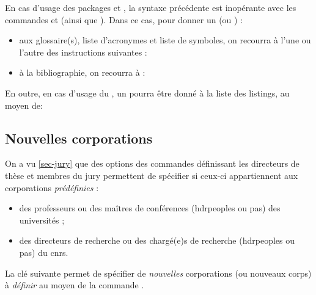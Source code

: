 En cas d'usage des packages  et , la
syntaxe précédente est inopérante avec les commandes
 et  (ainsi que
). Dans ce cas, pour donner un  (ou
)  :
\begin{itemize}
\item%
  aux glossaire(s), liste d'acronymes et liste de symboles, on recourra
  à l'une ou l'autre des instructions suivantes :
\begin{bodycode}[listing options={morekeywords={[2]title}}]
\printglossary[title="\meta{titre alternatif}"]
\printglossaries[title="\meta{titre alternatif}"]
\printacronyms[title="\meta{titre alternatif}"]
\printsymbols[title="\meta{titre alternatif}"]
\end{bodycode}
\item%
  à la bibliographie, on recourra à :
\begin{bodycode}[listing options={morekeywords={[2]title}}]
\printbibliography[title="\meta{titre alternatif}"]
\end{bodycode}
\end{itemize}

En outre, en cas d'usage du , un 
pourra être donné à la liste des listings, au moyen de:
\begin{preamblecode}[title=Par exemple dans le \File{\configurationfile}]
\renewcommand\lstlistingname{"\meta{titre alternatif}"}
\end{preamblecode}

\subsection{Nouvelles corporations}\label{sec-nouveaux-corps}
%
%

On a vu \vref{sec-jury} que des options des commandes définissant les
directeurs de thèse et membres du jury permettent de spécifier si ceux-ci
appartiennent aux corporations \emph{prédéfinies} :
\begin{itemize}
\item des professeurs ou des maîtres de conférences (\glspl{hdrpeople} ou pas) des
  universités ;
\item des directeurs de recherche ou des chargé(e)s de recherche (\glspl{hdrpeople} ou
  pas) du \gls{cnrs}.
\end{itemize}
La clé  suivante permet de spécifier de \emph{nouvelles}
corporations (ou nouveaux corps) à \emph{définir} au moyen de la commande
.

